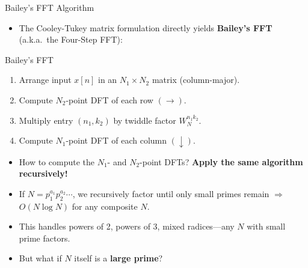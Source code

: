 \begin{frame}{Bailey's FFT Algorithm}
    \begin{itemize}
        \item The Cooley-Tukey matrix formulation directly yields \textbf{Bailey's FFT} (a.k.a.\ the Four-Step FFT):
    \end{itemize}
    \vspace{0.1cm}
    \begin{algorithmbox}{Bailey's FFT}
        \begin{enumerate}
            \item Arrange input $x[n]$ in an $N_1 \times N_2$ matrix (column-major).
            \item Compute $N_2$-point DFT of each row $(\rightarrow)$.
            \item Multiply entry $(n_1, k_2)$ by twiddle factor $W_N^{n_1 k_2}$.
            \item Compute $N_1$-point DFT of each column $(\downarrow)$.
        \end{enumerate}
    \end{algorithmbox}
    \vspace{0.2cm}
    \begin{itemize}
        \item How to compute the $N_1$- and $N_2$-point DFTs? \textbf{Apply the same algorithm recursively!}
        \item If $N = p_1^{a_1} p_2^{a_2} \cdots$, we recursively factor until only small primes remain $\Rightarrow$ $O(N \log N)$ for any composite $N$.
        \item This handles powers of 2, powers of 3, mixed radices—any $N$ with small prime factors.
        \item But what if $N$ itself is a \textbf{large prime}?
    \end{itemize}
\end{frame}



